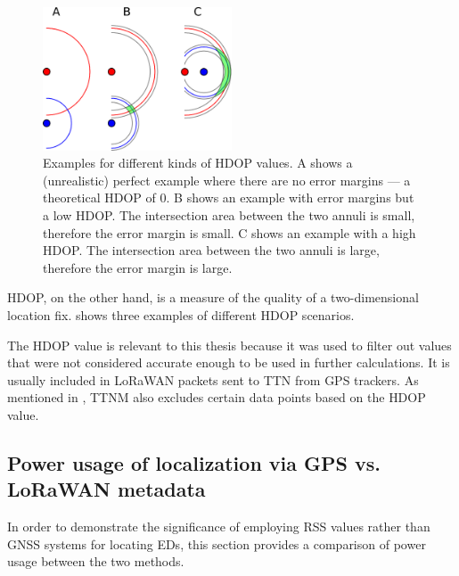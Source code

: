 \begin{figure}[htbp]
    \centering
    \includegraphics[width=0.5\textwidth]{pictures/multilateration/Geometric_Dilution_Of_Precision.eps}
    \caption[Examples for different kinds of \acl{HDOP} values]{
        Examples for different kinds of \ac{HDOP} values.
        A shows a (unrealistic) perfect example where there are no error margins --- a theoretical \ac{HDOP} of 0.
        B shows an example with error margins but a low \ac{HDOP}.
        The intersection area between the two annuli is small, therefore the error margin is small.
        C shows an example with a high \ac{HDOP}.
        The intersection area between the two annuli is large, therefore the error margin is large.\cite{xoneca_english_2013}
    }\label{pic:hdop-example-diagram}
\end{figure}

\ac{HDOP}, on the other hand, is a measure of the quality of a two-dimensional location fix.
 shows three examples of different \ac{HDOP} scenarios.

The \ac{HDOP} value is relevant to this thesis because it was used to filter out values that were not considered accurate enough to be used in further calculations.
It is usually included in \ac{LoRaWAN} packets sent to \ac{TTN} from \ac{GPS} trackers.
As mentioned in , \ac{TTNM} also excludes certain data points based on the \ac{HDOP} value.

\subsection{Power usage of localization via \acl{GPS} vs. \acs{LoRaWAN} metadata}\label{subsec:gnss-power-usage}

In order to demonstrate the significance of employing \ac{RSS} values rather than \ac{GNSS} systems for locating \aclp{ED}, this section provides a comparison of power usage between the two methods.

